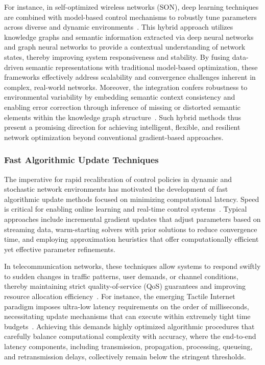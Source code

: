 \documentclass[sigconf]{acmart}
\begin{document}
For instance, in self-optimized wireless networks (SON), deep learning techniques are combined with model-based control mechanisms to robustly tune parameters across diverse and dynamic environments~\cite{ref1}. This hybrid approach utilizes knowledge graphs and semantic information extracted via deep neural networks and graph neural networks to provide a contextual understanding of network states, thereby improving system responsiveness and stability. By fusing data-driven semantic representations with traditional model-based optimization, these frameworks effectively address scalability and convergence challenges inherent in complex, real-world networks. Moreover, the integration confers robustness to environmental variability by embedding semantic context consistency and enabling error correction through inference of missing or distorted semantic elements within the knowledge graph structure~\cite{ref1}. Such hybrid methods thus present a promising direction for achieving intelligent, flexible, and resilient network optimization beyond conventional gradient-based approaches.

\subsubsection{Fast Algorithmic Update Techniques}

The imperative for rapid recalibration of control policies in dynamic and stochastic network environments has motivated the development of fast algorithmic update methods focused on minimizing computational latency. Speed is critical for enabling online learning and real-time control systems~\cite{ref2,ref3,ref6,ref8,ref9,ref11,ref15,ref16}. Typical approaches include incremental gradient updates that adjust parameters based on streaming data, warm-starting solvers with prior solutions to reduce convergence time, and employing approximation heuristics that offer computationally efficient yet effective parameter refinements.

In telecommunication networks, these techniques allow systems to respond swiftly to sudden changes in traffic patterns, user demands, or channel conditions, thereby maintaining strict quality-of-service (QoS) guarantees and improving resource allocation efficiency~\cite{ref10}. For instance, the emerging Tactile Internet paradigm imposes ultra-low latency requirements on the order of milliseconds, necessitating update mechanisms that can execute within extremely tight time budgets~\cite{ref10}. Achieving this demands highly optimized algorithmic procedures that carefully balance computational complexity with accuracy, where the end-to-end latency components, including transmission, propagation, processing, queueing, and retransmission delays, collectively remain below the stringent thresholds.
\end{document}
